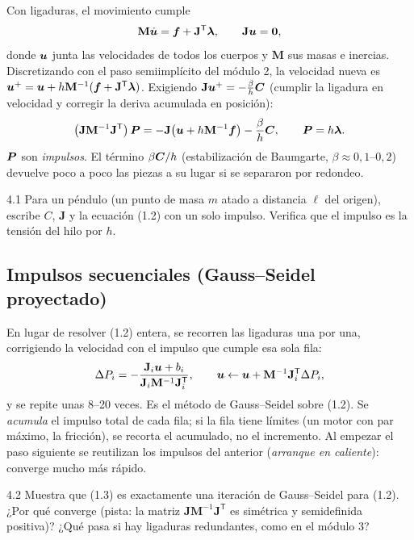 \documentclass[11pt,a4paper]{article}
\begin{document}
Con ligaduras, el movimiento cumple
\begin{equation}
  \mathbf M\dot{\bm{u}} = \bm{f} + \mathbf J^{\mathsf T}\bm{\lambda},\qquad \mathbf J\bm{u} = \bm{0},
\end{equation}
donde $\bm{u}$ junta las velocidades de todos los cuerpos y $\mathbf M$ sus masas e inercias. Discretizando con el
paso semiimplícito del módulo 2, la velocidad nueva es $\bm{u}^+ = \bm{u} + h\mathbf M^{-1}(\bm{f} + \mathbf
J^{\mathsf T}\bm{\lambda})$. Exigiendo $\mathbf J\bm{u}^+ = -\tfrac{\beta}{h}\bm{C}$ (cumplir la ligadura en
velocidad y corregir la deriva acumulada en posición):
\begin{equation}
  \bigl(\mathbf J\mathbf M^{-1}\mathbf J^{\mathsf T}\bigr)\,\bm{P} = -\mathbf J\bigl(\bm{u} + h\mathbf M^{-1}\bm{f}\bigr)
  - \frac{\beta}{h}\bm{C},\qquad \bm{P} = h\bm{\lambda} .
\end{equation}
$\bm{P}$ son \emph{impulsos}. El término $\beta\bm{C}/h$ (estabilización de Baumgarte, $\beta\approx0{,}1$--$0{,}2$)
devuelve poco a poco las piezas a su lugar si se separaron por redondeo.

\begin{ejercicio}{4.1}
Para un péndulo (un punto de masa $m$ atado a distancia $\ell$ del origen), escribe $C$, $\mathbf J$ y la ecuación
(1.2) con un solo impulso. Verifica que el impulso es la tensión del hilo por $h$.
\end{ejercicio}

\subsection{Impulsos secuenciales (Gauss--Seidel proyectado)}
En lugar de resolver (1.2) entera, se recorren las ligaduras una por una, corrigiendo la velocidad con el impulso que
cumple esa sola fila:
\begin{equation}
  \Delta P_i = -\frac{\mathbf J_i\bm{u} + b_i}{\mathbf J_i\mathbf M^{-1}\mathbf J_i^{\mathsf T}},\qquad
  \bm{u} \leftarrow \bm{u} + \mathbf M^{-1}\mathbf J_i^{\mathsf T}\Delta P_i ,
\end{equation}
y se repite unas 8--20 veces. Es el método de Gauss--Seidel sobre (1.2). Se \emph{acumula} el impulso total de cada
fila; si la fila tiene límites (un motor con par máximo, la fricción), se recorta el acumulado, no el incremento. Al
empezar el paso siguiente se reutilizan los impulsos del anterior (\emph{arranque en caliente}): converge mucho más
rápido.

\begin{ejercicio}{4.2}
Muestra que (1.3) es exactamente una iteración de Gauss--Seidel para (1.2). ¿Por qué converge (pista: la matriz
$\mathbf J\mathbf M^{-1}\mathbf J^{\mathsf T}$ es simétrica y semidefinida positiva)? ¿Qué pasa si hay ligaduras
redundantes, como en el módulo 3?
\end{ejercicio}
\end{document}
